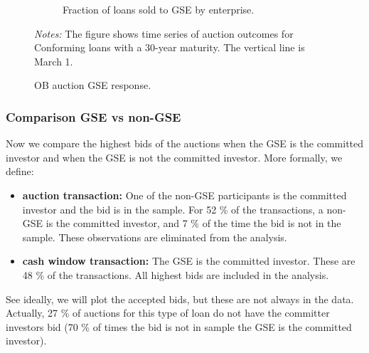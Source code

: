 \documentclass[11pt,a4paper]{article}
\begin{document}
\begin{figure}[h]
\begin{subfigure}[b]{0.49\textwidth}
      \caption{ Fraction of loans sold to GSE by enterprise. }
     \end{subfigure}
     \caption{OB auction  GSE response. } 
   \begin{minipage}{\textwidth}
      \footnotesize{\textit{Notes:} The figure shows time series of auction outcomes for Conforming loans with a 30-year maturity. The vertical line is March 1.  } 
      \end{minipage}
\end{figure}


\pagebreak
\subsubsection{Comparison GSE vs non-GSE}

Now we compare the highest bids of the auctions when the GSE is the committed investor and when the GSE is not the committed investor. More formally, we define: 

\begin{itemize}
  \item \textbf{auction transaction: } One of the non-GSE participants is the committed investor and the bid is in the sample. For 52 \% of the transactions, a non-GSE is the committed investor, and 7 \% of the time the bid is not in the sample. These observations are eliminated from the analysis.
  \item \textbf{cash window transaction: } The GSE is the committed investor. These are 48 \% of the transactions. All highest bids are included in the analysis. 
\end{itemize}

See ideally, we will plot the accepted bids, but these are not always in the data. Actually, 27 \% of auctions for this type of loan do not have the committer investors bid (70 \%  of times the bid is not in sample the GSE is the committed investor). 
\end{document}
